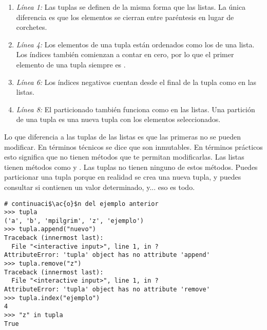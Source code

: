 \begin{enumerate}

\item \emph{Línea 1:} Las tuplas se definen de la misma forma que las listas. La única diferencia es que los elementos se cierran entre paréntesis en lugar de corchetes.

\item \emph{Línea 4:} Los elementos de una tupla están ordenados como los de una lista. Los índices también comienzan a contar en cero, por lo que el primer elemento de una tupla siempre es .

\item \emph{Línea 6:} Los índices negativos cuentan desde el final de la tupla como en las listas.

\item \emph{Línea 8:} El particionado también funciona como en las listas. Una partición de una tupla es una nueva tupla con los elementos seleccionados.

\end{enumerate}

Lo que diferencia a las tuplas de las listas es que las primeras no se pueden modificar. En términos técnicos se dice que son inmutables. En términos prácticos esto significa que no tienen métodos que te permitan modificarlas. Las listas tienen métodos como  y . Las tuplas no tienen ninguno de estos métodos. Puedes particionar una tupla porque en realidad se crea una nueva tupla, y puedes consultar si contienen un valor determinado, y... eso es todo.

\noindent\begin{minipage}{\textwidth}
\begin{lstlisting}[mathescape=True]
# continuaci$\ac{o}$n del ejemplo anterior
>>> tupla
('a', 'b', 'mpilgrim', 'z', 'ejemplo')
>>> tupla.append("nuevo")
Traceback (innermost last):
  File "<interactive input>", line 1, in ?
AttributeError: 'tupla' object has no attribute 'append'
>>> tupla.remove("z")
Traceback (innermost last):
  File "<interactive input>", line 1, in ?
AttributeError: 'tupla' object has no attribute 'remove'
>>> tupla.index("ejemplo")
4
>>> "z" in tupla
True
\end{lstlisting}
\end{minipage}

